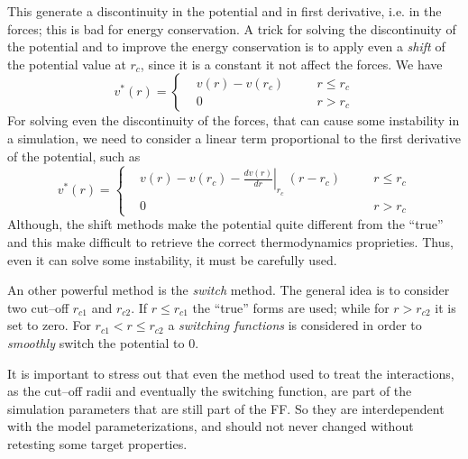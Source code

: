 This generate a discontinuity in the potential and in first derivative, i.e. in the forces; this is bad for energy conservation. A trick for solving the discontinuity of the potential and to improve the energy conservation is to apply even a \textit{shift} of the potential value at $r_c$, since it is a constant it not affect the forces. We have
\begin{equation*}
v^*(r) = \left \{
	\begin{aligned}
&v(r) - v(r_c) & \quad & r \le r_c \\
&0    & \quad  & r >   r_c
	\end{aligned} \right .
\end{equation*}
For solving even the discontinuity of the forces, that can cause some instability in a simulation, we need to consider a linear term proportional to the first derivative of the potential, such as
\begin{equation*}
v^*(r) = \left \{
	\begin{aligned}
&v(r) - v(r_c) - \left . \frac{dv(r)}{dr}\right |_{r_c}\ (r - r_c) & \quad & r \le r_c \\
&0    & \quad  & r >   r_c
	\end{aligned} \right .
\end{equation*}
Although, the shift methods make the potential quite different from the ``true'' and this make difficult to retrieve the correct thermodynamics proprieties. Thus, even it can solve some instability, it must be carefully used.

An other powerful method is the \textit{switch} method. The general idea is to consider two cut--off $r_{c1}$ and $r_{c2}$. If $r \le r_{c1}$ the ``true'' forms are used; while for $r > r_{c2}$ it is set to zero. For $r_{c1} < r \le r_{c2}$ a \textit{switching functions} is considered in order to \textit{smoothly} switch the potential to $0$.

It is important to stress out that even the method used to treat the interactions, as the cut--off radii and eventually the switching function, are part of the simulation parameters that are still part of the \ac{FF}. So they are interdependent with the model parameterizations, and should not never changed without retesting some target properties.


